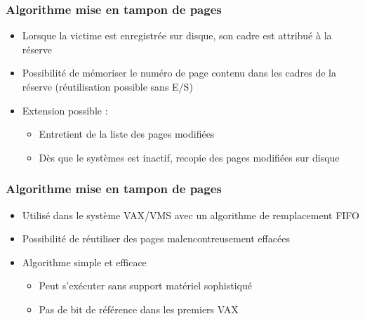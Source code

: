 \begin{frame}
\frametitle{Algorithme mise en tampon de pages}
\begin{itemize}
\item Lorsque la victime est enregistrée sur disque, son cadre est attribué à la réserve
\item Possibilité de mémoriser le numéro de page contenu dans les cadres de la réserve (réutilisation possible sans E/S)
\item Extension possible :
\begin{itemize}
\item Entretient de la liste des pages modifiées
\item Dès que le systèmes est inactif, recopie des pages modifiées sur disque
\end{itemize}
\end{itemize}
\end{frame}


\begin{frame}
\frametitle{Algorithme mise en tampon de pages}
\begin{itemize}
\item Utilisé dans le système VAX/VMS avec un algorithme de remplacement FIFO
\item Possibilité de réutiliser des pages malencontreusement effacées
\item Algorithme simple et efficace
\begin{itemize}
\item Peut s'exécuter sans support matériel sophistiqué
\item Pas de bit de référence dans les premiers VAX
\end{itemize}
\end{itemize}
\end{frame}

